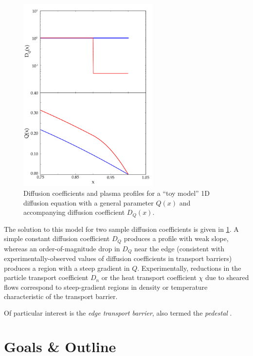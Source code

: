  \begin{figure}
  \includegraphics[width=70mm]{graphics/Introduction/transport.pdf}
  \caption{Diffusion coefficients and plasma profiles for a ``toy model'' 1D diffusion equation with a general parameter $Q(x)$ and accompanying diffusion coefficient $D_Q(x)$.}
  \label{fig:intro_transport}
 \end{figure}

\noindent The solution to this model for two sample diffusion coefficients is given in \cref{fig:intro_transport}.  A simple constant diffusion coefficient $D_Q$ produces a profile with weak slope, whereas an order-of-magnitude drop in $D_Q$ near the edge (consistent with experimentally-observed values of diffusion coefficients in transport barriers) produces a region with a steep gradient in $Q$.  Experimentally, reductions in the particle transport coefficient $D_n$ or the heat transport coefficient $\chi$ due to sheared flows correspond to steep-gradient regions in density or temperature characteristic of the transport barrier.

Of particular interest is the \emph{edge transport barrier}, also termed the \emph{pedestal} .

\nicesectionending


\section{Goals \& Outline}\label{sec:intro_outline}



\nicechapterending



 